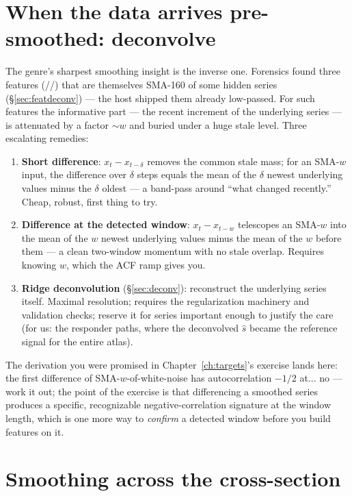 \section{When the data arrives pre-smoothed: deconvolve}

The genre's sharpest smoothing insight is the inverse one. Forensics found
three features (//) that are themselves SMA-160
of some hidden series (\S\ref{sec:featdeconv}) --- the host shipped them
already low-passed. For such features the informative part --- the recent
increment of the underlying series --- is attenuated by a factor
$\sim w$ and buried under a huge stale level. Three escalating remedies:

\begin{enumerate}
\item \textbf{Short difference}: $x_t - x_{t-\delta}$ removes the common
  stale mass; for an SMA-$w$ input, the difference over $\delta$ steps
  equals the mean of the $\delta$ newest underlying values minus the
  $\delta$ oldest --- a band-pass around ``what changed recently.'' Cheap,
  robust, first thing to try.
\item \textbf{Difference at the detected window}: $x_t - x_{t-w}$
  telescopes an SMA-$w$ into the mean of the $w$ newest underlying values
  minus the mean of the $w$ before them --- a clean two-window momentum
  with no stale overlap. Requires knowing $w$, which the ACF ramp gives
  you.
\item \textbf{Ridge deconvolution} (\S\ref{sec:deconv}): reconstruct the
  underlying series itself. Maximal resolution; requires the regularization
  machinery and validation checks; reserve it for series important enough
  to justify the care (for us: the responder paths, where the deconvolved
  $\hat s$ became the reference signal for the entire atlas).
\end{enumerate}

The derivation you were promised in Chapter~\ref{ch:targets}'s exercise
lands here: the first difference of SMA-$w$-of-white-noise has
autocorrelation $-1/2$ at... no --- work it out; the point of the exercise
is that differencing a smoothed series produces a specific, recognizable
negative-correlation signature at the window length, which is one more way
to \emph{confirm} a detected window before you build features on it.

\section{Smoothing across the cross-section}

